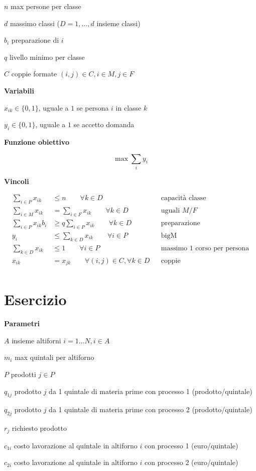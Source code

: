 \documentclass[10pt,a4paper,twoside,openright]{book}
\newcounter{es}
\newcommand{\Es}{
	\stepcounter{es}
	\section{Esercizio \arabic{es}}
	}
\numberwithin{es}{chapter}
\newcommand{\Par}{\textbf{Parametri}}
\newcommand{\Var}{\textbf{Variabili}}
\newcommand{\Fob}{\textbf{Funzione obiettivo}}
\newcommand{\Vin}{\textbf{Vincoli}}
\begin{document}
$n$ max persone per classe

$d$ massimo classi ($D=1,\dotsc ,d$ insieme classi)

$b_{i}$ preparazione di $i$

$q$ livello minimo per classe

$C$ coppie formate $( i,j) \in C,i\in M,j\in F$

\Var

$x_{ik} \in \{0,1\}$, uguale a $1$ se persona $i$ in classe $k$

$y_{i} \in \{0,1\}$, uguale a $1$ se accetto domanda

\Fob

\begin{equation*}
	\max\sum _{i} y_{i}
\end{equation*}

\Vin

\begin{align*}
	\sum _{i\in P} x_{ik} &\leq n\qquad\forall k\in D && \text{capacità classe} \\
	\sum _{i\in M} x_{ik} &=\sum _{i\in F} x_{ik} \qquad\forall k\in D && \text{uguali $M/F$} \\
	\sum _{i\in P} x_{ik} b_{i} &\geq q\sum _{i\in P} x_{ik} \qquad\forall k\in D && \text{preparazione} \\
	y_{i} &\leq \sum _{k\in D} x_{ik} \qquad\forall i\in P && \text{bigM} \\
	\sum _{k\in D} x_{ik} &\leq 1\qquad\forall i\in P && \text{massimo $1$ corso per persona} \\
	x_{ik} &=x_{jk} \qquad\forall (i,j)\in C,\forall k\in D && \text{coppie} \\
\end{align*}

\Es

\Par

$A$ insieme altiforni $i=1\dotsc N,i\in A$

$m_{i}$ max quintali per altiforno

$P$ prodotti $j\in P$

$q_{1j}$ prodotto $j$ da 1 quintale di materia prime con processo 1 (prodotto/quintale)

$q_{2j}$ prodotto $j$ da 1 quintale di materia prime con processo 2 (prodotto/quintale)

$r_{j}$ richiesto prodotto

$c_{1i}$ costo lavorazione al quintale in altiforno $i$ con processo 1 (euro/quintale)

$c_{2i}$ costo lavorazione al quintale in altiforno $i$ con processo $2$ (euro/quintale)
\end{document}
